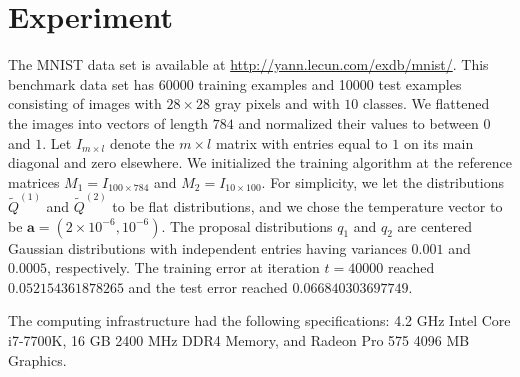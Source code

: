 \documentclass{article}
\begin{document}
\section{Experiment}\label{Experiments section}
The MNIST data set is available at \url{http://yann.lecun.com/exdb/mnist/}. This benchmark data set has 60000 training examples and 10000 test examples consisting of images with $28\times 28$ gray pixels and with $10$ classes. We flattened the images into vectors of length $784$ and normalized their values to between $0$ and $1$. Let $I_{m\times l}$ denote the $m\times l$ matrix with entries equal to $1$ on its main diagonal and zero elsewhere. We initialized the training algorithm at the reference matrices $M_1=I_{100\times 784}$ and $M_2=I_{10\times 100}$. For simplicity, we let the distributions $\tilde{Q}^{(1)}$ and $\tilde{Q}^{(2)}$ to be flat distributions, and we chose the temperature vector to be $\mathbf{a}=(2\times 10^{-6},10^{-6})$.   
The proposal distributions $q_1$ and $q_2$ are centered Gaussian distributions with independent entries having variances $0.001$ and $0.0005$, respectively. The training error at iteration $t=40000$ reached $0.052154361878265$ and the test error reached $0.066840303697749$. 

The computing infrastructure had the following specifications: 4.2 GHz Intel Core i7-7700K, 16 GB 2400 MHz DDR4 Memory, and Radeon Pro 575 4096 MB Graphics.
\end{document}
